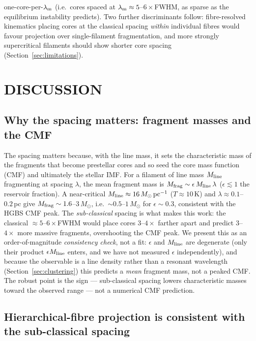 \documentclass[usenatbib,twoside,twocolumn]{mnras}
\begin{document}
one-core-per-$\lambda_{\rm m}$ (i.e.\ cores spaced at $\lambda_{\rm m}\approx5$--$6\times$FWHM, as sparse as the equilibrium instability predicts). Two further discriminants follow: fibre-resolved kinematics placing cores at the classical spacing \emph{within} individual fibres would favour projection over single-filament fragmentation, and more strongly supercritical filaments should show shorter core spacing (Section~\ref{sec:limitations}).

\section{DISCUSSION}
\label{sec:discussion}

\subsection{Why the spacing matters: fragment masses and the CMF}
\label{sec:cmf}
The spacing matters because, with the line mass, it sets the characteristic mass of the fragments that become prestellar cores and so seed the core mass function (CMF) and ultimately the stellar IMF. For a filament of line mass $M_{\rm line}$ fragmenting at spacing $\lambda$, the mean fragment mass is $M_{\rm frag}\sim\epsilon\,M_{\rm line}\,\lambda$ ($\epsilon\lesssim1$ the reservoir fraction). A near-critical $M_{\rm line}\approx16\,M_\odot\,{\rm pc^{-1}}$ ($T\approx10$\,K) and $\lambda\approx0.1$--$0.2$\,pc give $M_{\rm frag}\sim1.6$--$3\,M_\odot$, i.e.\ $\sim0.5$--$1\,M_\odot$ for $\epsilon\sim0.3$, consistent with the HGBS CMF peak. The \emph{sub-classical} spacing is what makes this work: the classical $\approx5$--$6\times$FWHM would place cores $3$--$4\times$ farther apart and predict $3$--$4\times$ more massive fragments, overshooting the CMF peak. We present this as an order-of-magnitude \emph{consistency check}, not a fit: $\epsilon$ and $M_{\rm line}$ are degenerate (only their product $\epsilon M_{\rm line}$ enters, and we have not measured $\epsilon$ independently), and because the observable is a line density rather than a resonant wavelength (Section~\ref{sec:clustering}) this predicts a \emph{mean} fragment mass, not a peaked CMF. The robust point is the sign --- sub-classical spacing lowers characteristic masses toward the observed range --- not a numerical CMF prediction.


\subsection{Hierarchical-fibre projection is consistent with the sub-classical spacing}
\label{sec:fibre_projection}
\end{document}
